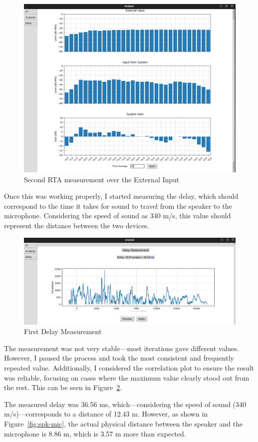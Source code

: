 \begin{figure}[H]
	\centering
	\includegraphics[width=0.6
	\linewidth]{Figures/Coro_Pink_Good.png}
	\caption{Second RTA measurement over the External Input}
	\label{fig:Coro_Good_Pink}
\end{figure}

Once this was working properly, I started measuring the delay, which should correspond to the time it takes for sound to travel from the speaker to the microphone. Considering the speed of sound as 340 m/s, this value should represent the distance between the two devices.

\begin{figure}[H]
	\centering
	\includegraphics[width=0.6
	\linewidth]{Figures/Coro_Delay.png}
	\caption{First Delay Measurement}
	\label{fig:Coro_delay1}
\end{figure}

The measurement was not very stable—most iterations gave different values. However, I paused the process and took the most consistent and frequently repeated value. Additionally, I considered the correlation plot to ensure the result was reliable, focusing on cases where the maximum value clearly stood out from the rest. This can be seen in Figure~\ref{fig:Coro_delay1}. 

The measured delay was 36.56 ms, which—considering the speed of sound (340 m/s)—corresponds to a distance of 12.43 m. However, as shown in Figure~\ref{fig:spk-mic}, the actual physical distance between the speaker and the microphone is 8.86 m, which is 3.57 m more than expected.

